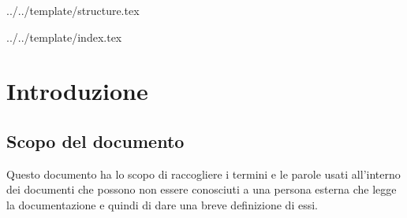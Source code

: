 


\def\DOCUMENTO{Glossario}
\def\VERSIONE{1.0.0}

\def\REDATTORE {Agostinetto Matteo\\ & Carraro Nicola\\ & Crespan Emanuele\\ & Ros Fabio}
\def\VERIFICATORE {Suierica Bogdan}
\def\RESPONSABILE {Burlin Valerio}

\def\USO {Esterno}

\def\DISTRIBUZIONE {\COMMITTENTE{}\\ & \PROPONENTE{}\\}

\def\DESCRIZIONE {Documento con la descrizione dei termini tecnici poco conosciuti.}


\def\INDICE	{false}
\def\TABELLE {false}
\def\FIGURE {false}


 {../../template/structure.tex}



 {../../template/index.tex}

\section{Introduzione}
\subsection{Scopo del documento}
Questo documento ha lo scopo di raccogliere i termini e le parole usati all'interno dei documenti che possono non essere conosciuti a una persona esterna che legge la documentazione e quindi di dare una breve definizione di essi.
\newpage


\glsaddall



\printglossary[title=Glossario, nonumberlist]



